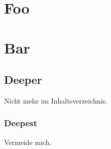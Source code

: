 \section{Foo}
\setauthor{\firstauthor}
\lipsum[5-12]

\section{Bar}
\setauthor{\secondauthor}
\lipsum[12-18]

\subsection{Deeper}
Nicht mehr im Inhaltsverzeichnis.

\subsubsection{Deepest}
Vermeide mich.